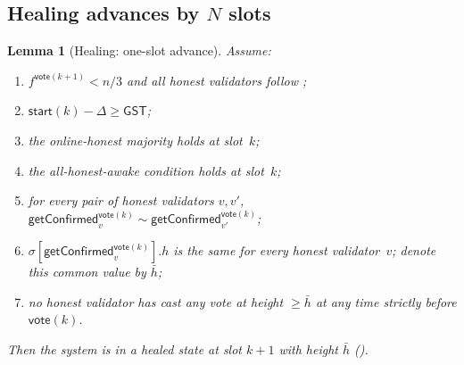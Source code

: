\documentclass{article}
\newcommand{\start}{\mathsf{start}}
\newcommand{\vote}{\mathsf{vote}}
\newcommand{\comm}[1]{\bar{#1}}
\newcommand{\getConfirmed}{\textsf{getConfirmed}\xspace}
\theoremstyle{plain}
\newtheorem{lemma}{Lemma}
\theoremstyle{definition}
\theoremstyle{remark}
\newcommand{\GST}{\ensuremath{\mathsf{GST}}}
\newcommand{\OHM}{online-honest majority\xspace}
\newcommand{\AHA}{all-honest-awake\xspace}
\begin{document}
\subsection{Healing advances by $N$ slots}\label{rev:sec:healing-advances}

\begin{lemma}[Healing: one-slot advance]\label{rev:lem:healing-one-slot}
Assume:
\begin{enumerate}
  \item $f^{\vote(k+1)} < n/3$ and all honest validators follow ;
  \item $\start(k) - \Delta \geq \GST$;
  \item the \OHM holds at slot~$k$;
  \item the \AHA condition holds at slot~$k$;
  \item for every pair of honest validators $v, v'$, $\getConfirmed_v^{\vote(k)} \sim \getConfirmed_{v'}^{\vote(k)}$;
  \item $\sigma[\getConfirmed_v^{\vote(k)}].h$ is the same for every honest validator~$v$; denote this common value by $\comm{h}$;
  \item no honest validator has cast any vote at height $\geq \comm{h}$ at any time strictly before $\vote(k)$.
\end{enumerate}
Then the system is in a healed state at slot $k+1$ with height $\comm{h}$ ().
\end{lemma}
\end{document}
